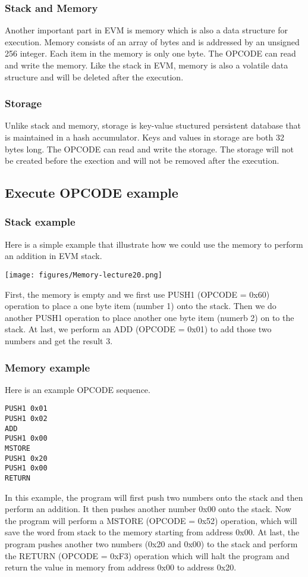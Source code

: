 \documentclass{article}
\begin{document}
\subsubsection*{Stack and Memory}
Another important part in EVM is memory which is also a data structure for execution. Memory consists of an array of bytes and is addressed by an unsigned 256 integer. Each item in the memory is only one byte. The OPCODE can read and write the memory. Like the stack in EVM, memory is also a volatile data structure and will be deleted after the execution.

\subsubsection*{Storage}
Unlike stack and memory, storage is key-value stuctured persistent database that is maintained in a hash accumulator. Keys and values in storage are both 32 bytes long. The OPCODE can read and write the storage. The storage will not be created before the exection and will not be removed after the execution.

\subsection*{Execute OPCODE example}
\subsubsection*{Stack example}
Here is a simple example that illustrate how we could use the memory to perform an addition in EVM stack.
\begin{center}
    \texttt{[image: figures/Memory-lecture20.png]}
\end{center}
First, the memory is empty and we first use PUSH1 (OPCODE = 0x60) operation to place a one byte item (number 1) onto the stack. Then we do another PUSH1 operation to place another one byte item (numerb 2) on to the stack. At last, we perform an ADD (OPCODE = 0x01) to add those two numbers and get the result 3.
\subsubsection*{Memory example}
Here is an example OPCODE sequence.
\begin{lstlisting}
PUSH1 0x01
PUSH1 0x02
ADD
PUSH1 0x00
MSTORE
PUSH1 0x20
PUSH1 0x00
RETURN
\end{lstlisting}
In this example, the program will first push two numbers onto the stack and then perform an addition. It then pushes another number 0x00 onto the stack. Now the program will perform a MSTORE (OPCODE = 0x52) operation, which will save the word from stack to the memory starting from address 0x00. At last, the program pushes another two numbers (0x20 and 0x00) to the stack and perform the RETURN (OPCODE = 0xF3) operation which will halt the program and return the value in memory from address 0x00 to address 0x20.
\end{document}
